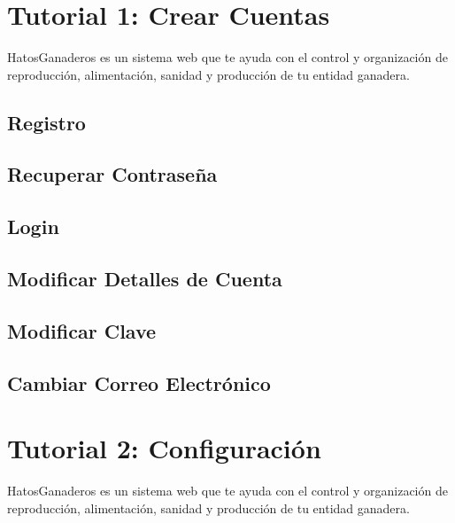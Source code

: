 \documentclass[letterpaper,10pt,english]{sphinxmanual}
\begin{document}
\section{Tutorial 1: Crear Cuentas}
\label{Tutorial 1: Crear Cuentas::doc}\label{Tutorial 1: Crear Cuentas:tutorial-1-crear-cuentas}
HatosGanaderos es un sistema web que te ayuda con el control y organización de reproducción, alimentación, sanidad y producción de tu entidad ganadera.


\subsection{Registro}
\label{Tutorial 1: Crear Cuentas:registro}

\subsection{Recuperar Contraseña}
\label{Tutorial 1: Crear Cuentas:recuperar-contrasena}

\subsection{Login}
\label{Tutorial 1: Crear Cuentas:login}

\subsection{Modificar Detalles de Cuenta}
\label{Tutorial 1: Crear Cuentas:modificar-detalles-de-cuenta}

\subsection{Modificar Clave}
\label{Tutorial 1: Crear Cuentas:modificar-clave}

\subsection{Cambiar Correo Electrónico}
\label{Tutorial 1: Crear Cuentas:cambiar-correo-electronico}

\section{Tutorial 2: Configuración}
\label{Tutorial 2: Configuraci_xf3n:tutorial-2-configuracion}\label{Tutorial 2: Configuraci_xf3n::doc}
HatosGanaderos es un sistema web que te ayuda con el control y organización de reproducción, alimentación, sanidad y producción de tu entidad ganadera.
\end{document}
